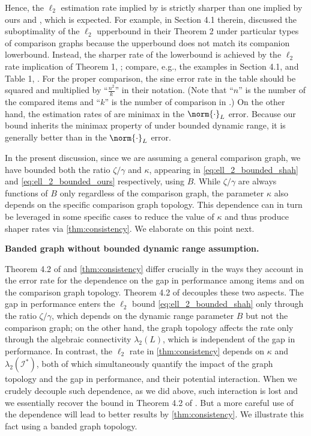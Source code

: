 Hence, the $\ell_2$ estimation rate implied by \citet{hendrickx2019graph} is strictly sharper than one implied by ours and \citet{shah2016estimation}, which is expected. For example, in Section 4.1 therein, \citet{shah2016estimation} discussed the suboptimality of the $\ell_2$ upperbound in their Theorem 2 under particular types of comparison graphs because the upperbound does not match its companion lowerbound. Instead, the sharper rate of the lowerbound is achieved by the $\ell_2$ rate implication of Theorem 1, \citet{hendrickx2019graph}; compare, e.g.,  the examples in Section 4.1, \citet{shah2016estimation} and Table 1, \citet{hendrickx2019graph}. For the proper comparison, the sine error rate in the table should be squared and multiplied by ``$\frac{n^2}{k}$'' in their notation. (Note that ``$n$'' is the number of the compared items and ``$k$'' is the number of comparison in \citet{hendrickx2019graph}.) On the other hand, the estimation rates of \citet{shah2016estimation} are minimax in the $\norm{\cdot}_L$ error. Because our bound inherits the minimax property of \citet{shah2016estimation} under bounded dynamic range, it is generally better than \citet{hendrickx2019graph} in the $\norm{\cdot}_L$ error.

In the present discussion, since we are assuming a general comparison graph, we have bounded both the ratio $\zeta/\gamma$ and $\kappa$, appearing in \eqref{eq:ell_2_bounded_shah} and  \eqref{eq:ell_2_bounded_ours} respectively, using $B$. While $\zeta/\gamma$  are always functions of $B$ only regardless of the comparison graph, the parameter $\kappa$ also depends on the specific comparison graph topology. This dependence can in turn be leveraged in some specific cases to reduce the value of $\kappa$ and thus produce shaper rates via \ref{thm:consistency}. We elaborate on this point next.

{\bf Banded graph  without bounded dynamic range assumption.}

Theorem 4.2 of \citet{shah2016estimation} and \ref{thm:consistency} differ crucially in the ways they account in the error rate for the dependence on the gap in performance among items and on the comparison graph topology. Theorem 4.2 of \citet{shah2016estimation} decouples these two aspects. The gap in performance enters the $\ell_2$ bound \eqref{eq:ell_2_bounded_shah} only through the ratio $\zeta/\gamma$, which depends on the dynamic range parameter $B$ but not the comparison graph; on the other hand, the graph topology affects the rate only through the algebraic connectivity $\lambda_2(L)$, which is independent of the gap in performance. In contrast, the $\ell_2$ rate in \ref{thm:consistency} depends on $\kappa$ and $\lambda_2(\mathcal{I}^*)$, both of which simultaneously quantify the impact of the graph topology and the gap in performance, and their potential interaction. When we crudely decouple such dependence, as we did above, such interaction is lost and we essentially recover the bound in Theorem 4.2 of \citet{shah2016estimation}. But a more careful use of the dependence will lead to better results by \ref{thm:consistency}. We illustrate this fact using a banded graph topology.

